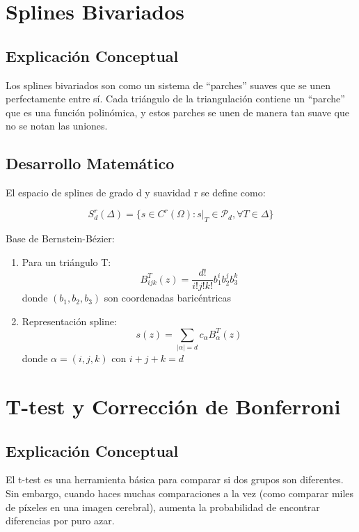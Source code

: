 \documentclass[12pt,a4paper]{article}
\begin{document}
\section{Splines Bivariados}

\subsection{Explicación Conceptual}
Los splines bivariados son como un sistema de ``parches'' suaves que se unen perfectamente entre sí. Cada triángulo de la triangulación contiene un ``parche'' que es una función polinómica, y estos parches se unen de manera tan suave que no se notan las uniones.

\subsection{Desarrollo Matemático}
El espacio de splines de grado d y suavidad r se define como:

\begin{equation}
S^r_d(\Delta) = \{s \in C^r(\Omega): s|_T \in \mathcal{P}_d, \forall T \in \Delta\}
\end{equation}

Base de Bernstein-Bézier:
\begin{enumerate}
\item Para un triángulo T:
  \begin{equation}
  B^T_{ijk}(z) = \frac{d!}{i!j!k!}b_1^i b_2^j b_3^k
  \end{equation}
  donde $(b_1,b_2,b_3)$ son coordenadas baricéntricas

\item Representación spline:
  \begin{equation}
  s(z) = \sum_{|\alpha|=d} c_\alpha B^T_\alpha(z)
  \end{equation}
  donde $\alpha = (i,j,k)$ con $i+j+k=d$
\end{enumerate}

\section{T-test y Corrección de Bonferroni}

\subsection{Explicación Conceptual}
El t-test es una herramienta básica para comparar si dos grupos son diferentes. Sin embargo, cuando haces muchas comparaciones a la vez (como comparar miles de píxeles en una imagen cerebral), aumenta la probabilidad de encontrar diferencias por puro azar.
\end{document}
